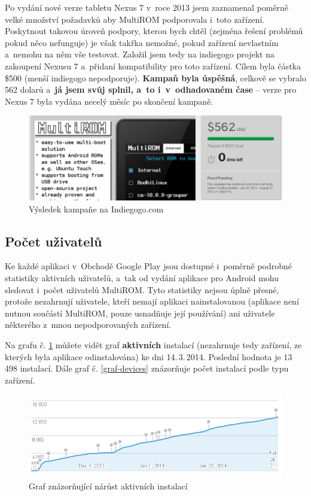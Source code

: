 \documentclass[12pt, a4paper, oneside]{article}
\newcommand{\B}{\textbf} %
\begin{document}
Po vydání nové verze tabletu Nexus 7 v~roce 2013 jsem zaznamenal poměrně velké množství požadavků aby MultiROM podporovala i~toto zařízení. Poskytnout takovou úroveň podpory, kterou bych chtěl (zejména řešení problémů pokud něco nefunguje) je však takřka nemožné, pokud zařízení nevlastním a~nemohu na něm vše testovat. Založil jsem tedy na indiegogo projekt na zakoupení Nexusu 7 a~přidaní kompatibility pro toto zařízení\cite{indiegogo-multirom}. Cílem byla částka \$500 (menší indiegogo nepodporuje). \B{Kampaň byla úspěšná}, celkově se vybralo 562 dolarů a~\B{já jsem svůj  splnil, a~to i~v~odhadovaném čase} -- verze pro Nexus 7 byla vydána necelý měsíc po skončení kampaně.

\begin{figure}[H]
\begin{center}
 \includegraphics[width=\textwidth]{img/indiegogo.png}
\caption{Výsledek kampaňe na Indiegogo.com}
\end{center}
\end{figure}

\subsection{Počet uživatelů}
Ke každé aplikaci v~Obchodě Google Play jsou dostupné i~poměrně podrobné statistiky aktivních uživatelů, a~tak od vydání aplikace pro Android mohu sledovat i~počet uživatelů MultiROM. Tyto statistiky nejsou úplně přesné, protože nezahrnují uživatele, kteří nemají aplikaci nainstalovanou (aplikace není nutnou součástí MultiROM, pouze usnadňuje její používání) ani uživatele některého z~mnou nepodporovaných zařízení.

Na grafu č. \ref{graf-uzivatele} můžete vidět graf \B{aktivních} instalací (nezahrnuje tedy zařízení, ze kterých byla aplikace odinstalována) ke dni 14.\,3.\,2014. Poslední hodnota je 13 498 instalací. Dále graf č. \ref{graf-devices} znázorňuje počet instalací podle typu zařízení.

\begin{figure}[H]
\begin{center}
 \includegraphics[width=\textwidth]{img/graph_active.png}
\caption{Graf znázorňující nárůst aktivních instalací}
\label{graf-uzivatele}
\end{center}
\end{figure}
\end{document}
